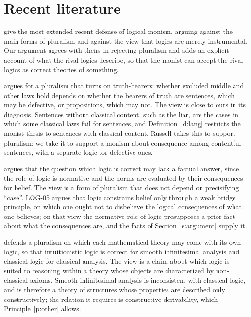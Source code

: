 \documentclass{situationist-preprint}
\begin{document}
\section{Recent literature}

\citet{GriffithsPaseau2022} give the most extended recent defense of logical monism, arguing against the main forms of pluralism and against the view that logics are merely instrumental. Our argument agrees with theirs in rejecting pluralism and adds an explicit account of what the rival logics describe, so that the monist can accept the rival logics as correct theories of something.

\citet{Russell2008} argues for a pluralism that turns on truth-bearers: whether excluded middle and other laws hold depends on whether the bearers of truth are sentences, which may be defective, or propositions, which may not. The view is close to ours in its diagnosis. Sentences without classical content, such as the liar, are the cases in which some classical laws fail for sentences, and Definition~\ref{d:lang} restricts the monist thesis to sentences with classical content. Russell takes this to support pluralism; we take it to support a monism about consequence among contentful sentences, with a separate logic for defective ones.

\citet{Field2009} argues that the question which logic is correct may lack a factual answer, since the role of logic is normative and the norms are evaluated by their consequences for belief. The view is a form of pluralism that does not depend on precisifying \enquote{case}. LOG-05 argues that logic constrains belief only through a weak bridge principle, on which one ought not to disbelieve the logical consequences of what one believes; on that view the normative role of logic presupposes a prior fact about what the consequences are, and the facts of Section~\ref{s:argument} supply it.

\citet{Shapiro2014} defends a pluralism on which each mathematical theory may come with its own logic, so that intuitionistic logic is correct for smooth infinitesimal analysis and classical logic for classical analysis. The view is a claim about which logic is suited to reasoning within a theory whose objects are characterized by non-classical axioms. Smooth infinitesimal analysis is inconsistent with classical logic, and is therefore a theory of structures whose properties are described only constructively; the relation it requires is constructive derivability, which Principle~\ref{p:other} allows.
\end{document}
